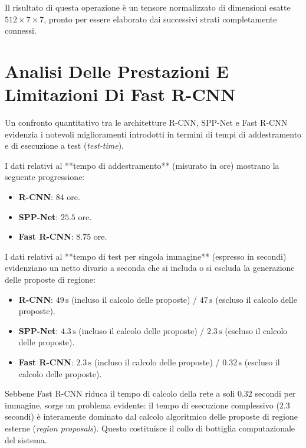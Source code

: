 ﻿\documentclass[11pt, a4paper]{article}
\begin{document}
Il risultato di questa operazione è un tensore normalizzato di dimensioni esatte $512 \times 7 \times 7$, pronto per essere elaborato dai successivi strati completamente connessi.


\newpage

\section{Analisi Delle Prestazioni E Limitazioni Di Fast R-CNN}

Un confronto quantitativo tra le architetture R-CNN, SPP-Net e Fast R-CNN evidenzia i notevoli miglioramenti introdotti in termini di tempi di addestramento e di esecuzione a test (\emph{test-time}).

I dati relativi al **tempo di addestramento** (misurato in ore) mostrano la seguente progressione:
\begin{itemize}
    \item \textbf{R-CNN}: $84$ ore.
    \item \textbf{SPP-Net}: $25.5$ ore.
    \item \textbf{Fast R-CNN}: $8.75$ ore.
\end{itemize}

I dati relativi al **tempo di test per singola immagine** (espresso in secondi) evidenziano un netto divario a seconda che si includa o si escluda la generazione delle proposte di regione:
\begin{itemize}
    \item \textbf{R-CNN}: $49\,\text{s}$ (incluso il calcolo delle proposte) / $47\,\text{s}$ (escluso il calcolo delle proposte).
    \item \textbf{SPP-Net}: $4.3\,\text{s}$ (incluso il calcolo delle proposte) / $2.3\,\text{s}$ (escluso il calcolo delle proposte).
    \item \textbf{Fast R-CNN}: $2.3\,\text{s}$ (incluso il calcolo delle proposte) / $0.32\,\text{s}$ (escluso il calcolo delle proposte).
\end{itemize}


Sebbene Fast R-CNN riduca il tempo di calcolo della rete a soli $0.32$ secondi per immagine, sorge un problema evidente: il tempo di esecuzione complessivo ($2.3$ secondi) è interamente dominato dal calcolo algoritmico delle proposte di regione esterne (\emph{region proposals}). Questo costituisce il collo di bottiglia computazionale del sistema.
\end{document}
